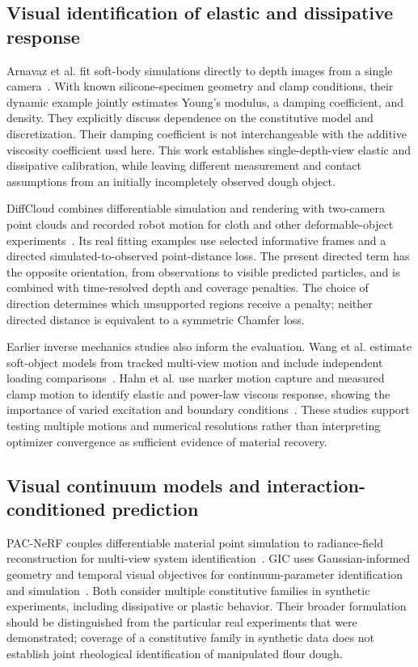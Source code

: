 \subsection{Visual identification of elastic and dissipative response}

Arnavaz et al. fit soft-body simulations directly to depth images from a single camera~\cite{diffcal2023}. With known silicone-specimen geometry and clamp conditions, their dynamic example jointly estimates Young's modulus, a damping coefficient, and density. They explicitly discuss dependence on the constitutive model and discretization. Their damping coefficient is not interchangeable with the additive viscosity coefficient used here. This work establishes single-depth-view elastic and dissipative calibration, while leaving different measurement and contact assumptions from an initially incompletely observed dough object.

DiffCloud combines differentiable simulation and rendering with two-camera point clouds and recorded robot motion for cloth and other deformable-object experiments~\cite{diffcloud2022}. Its real fitting examples use selected informative frames and a directed simulated-to-observed point-distance loss. The present directed term has the opposite orientation, from observations to visible predicted particles, and is combined with time-resolved depth and coverage penalties. The choice of direction determines which unsupported regions receive a penalty; neither directed distance is equivalent to a symmetric Chamfer loss.

Earlier inverse mechanics studies also inform the evaluation. Wang et al. estimate soft-object models from tracked multi-view motion and include independent loading comparisons~\cite{wang2015}. Hahn et al. use marker motion capture and measured clamp motion to identify elastic and power-law viscous response, showing the importance of varied excitation and boundary conditions~\cite{hahn2019}. These studies support testing multiple motions and numerical resolutions rather than interpreting optimizer convergence as sufficient evidence of material recovery.

\subsection{Visual continuum models and interaction-conditioned prediction}

PAC-NeRF couples differentiable material point simulation to radiance-field reconstruction for multi-view system identification~\cite{pacnerf2023}. GIC uses Gaussian-informed geometry and temporal visual objectives for continuum-parameter identification and simulation~\cite{gic2024}. Both consider multiple constitutive families in synthetic experiments, including dissipative or plastic behavior. Their broader formulation should be distinguished from the particular real experiments that were demonstrated; coverage of a constitutive family in synthetic data does not establish joint rheological identification of manipulated flour dough.

